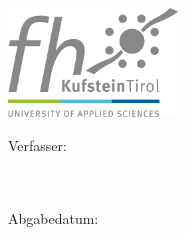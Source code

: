 \begin{titlepage}
 
    \vfill
    \begin{center}
      \includegraphics[width=4.5cm]{img/kufstein_logo.png} \\ 
    \end{center}
    \vfill
  
    \begin{center}
      \Large \textbf{\mytitle}
    \end{center} 
    \vfill
  
  
  
  
    \begin{center}
      Verfasser:\\
      \vspace{0.1cm}
      \large \textbf{\myname}\\
      \vspace{0.1cm}
      \large \textbf{\mypkz}\\
    \end{center}
    \vfill
  
  
    \begin{center}
      Abgabedatum: \\
      \vspace{0.1cm}
      \large \textbf{\mydate}
    \end{center} 
    \vfill  
  \end{titlepage}
